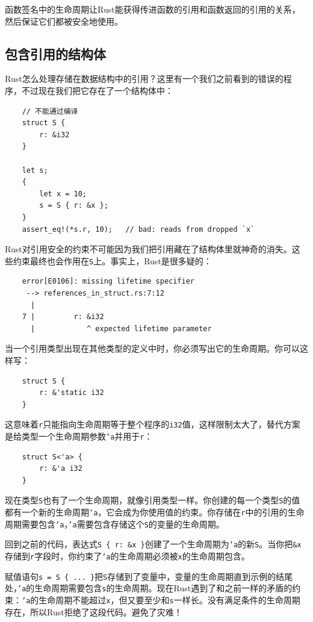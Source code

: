函数签名中的生命周期让Rust能获得传进函数的引用和函数返回的引用的关系，然后保证它们都被安全地使用。

\subsection{包含引用的结构体}\label{refstruct}

Rust怎么处理存储在数据结构中的引用？这里有一个我们之前看到的错误的程序，不过现在我们把它存在了一个结构体中：
\begin{verbatim}
    // 不能通过编译
    struct S {
        r: &i32
    }
    
    let s;
    {
        let x = 10;
        s = S { r: &x };
    }
    assert_eq!(*s.r, 10);   // bad: reads from dropped `x`
\end{verbatim}

Rust对引用安全的约束不可能因为我们把引用藏在了结构体里就神奇的消失。这些约束最终也会作用在\texttt{S}上。事实上，Rust是很多疑的：
\begin{verbatim}
    error[E0106]: missing lifetime specifier
     --> references_in_struct.rs:7:12
      |
    7 |         r: &i32
      |            ^ expected lifetime parameter
\end{verbatim}

当一个引用类型出现在其他类型的定义中时，你必须写出它的生命周期。你可以这样写：
\begin{verbatim}
    struct S {
        r: &'static i32
    }
\end{verbatim}

这意味着\texttt{r}只能指向生命周期等于整个程序的\texttt{i32}值，这样限制太大了，替代方案是给类型一个生命周期参数\texttt{'a}并用于\texttt{r}：
\begin{verbatim}
    struct S<'a> {
        r: &'a i32
    }
\end{verbatim}

现在类型\texttt{S}也有了一个生命周期，就像引用类型一样。你创建的每一个类型\texttt{S}的值都有一个新的生命周期\texttt{'a}，它会成为你使用值的约束。你存储在\texttt{r}中的引用的生命周期需要包含\texttt{'a}，\texttt{'a}需要包含存储这个\texttt{S}的变量的生命周期。

回到之前的代码，表达式\texttt{S \{ r: \&x \}}创建了一个生命周期为\texttt{'a}的新\texttt{S}。当你把\texttt{\&x}存储到\texttt{r}字段时，你约束了\texttt{'a}的生命周期必须被\texttt{x}的生命周期包含。

赋值语句\texttt{s = S \{ ... \}}把\texttt{S}存储到了变量中，变量的生命周期直到示例的结尾处，\texttt{'a}的生命周期需要包含\texttt{s}的生命周期。现在Rust遇到了和之前一样的矛盾的约束：\texttt{'a}的生命周期不能超过\texttt{x}，但又要至少和\texttt{s}一样长。没有满足条件的生命周期存在，所以Rust拒绝了这段代码。避免了灾难！

